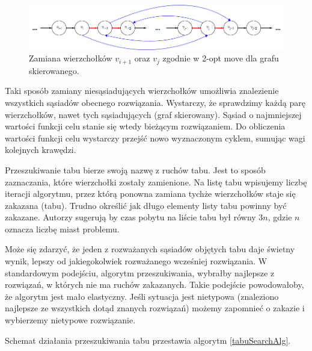 \documentclass[11pt,a4paper,twoside]{article}
\begin{document}
\begin{figure}[ht]
\vspace{-0pt}
\centering
\includegraphics[width=15cm]{2optMove}
\caption{Zamiana wierzchołków $v_{i+1}$ oraz $v_{j}$ zgodnie w 2-opt move dla grafu skierowanego.}
\label{2optMove}
\end{figure}

Taki sposób zamiany niesąsiadujących wierzchołków umożliwia znalezienie wszystkich sąsiadów obecnego rozwiązania. Wystarczy, że sprawdzimy każdą parę wierzchołków, nawet tych sąsiadujących (graf skierowany). Sąsiad o najmniejszej wartości funkcji celu stanie się wtedy bieżącym rozwiązaniem. Do obliczenia wartości funkcji celu wystarczy przejść nowo wyznaczonym cyklem, sumując wagi kolejnych krawędzi.

Przeszukiwanie tabu bierze swoją nazwę z ruchów tabu. Jest to sposób zaznaczania, które wierzchołki zostały zamienione. Na listę tabu wpisujemy liczbę iteracji algorytmu, przez którą ponowna zamiana tychże wierzchołków staje się zakazana (tabu). Trudno określić jak długo elementy listy tabu powinny być zakazane. Autorzy \cite{FogelHeurystyka} sugerują by czas pobytu na liście tabu był równy $3n$, gdzie $n$ oznacza liczbę miast problemu.

Może się zdarzyć, że jeden z rozważanych sąsiadów objętych tabu daje świetny wynik, lepszy od jakiegokolwiek rozważanego wcześniej rozwiązania. W standardowym podejściu, algorytm przeszukiwania, wybrałby najlepsze z rozwiązań, w których nie ma ruchów zakazanych. Takie podejście powodowałoby, że algorytm jest mało elastyczny. Jeśli sytuacja jest nietypowa (znaleziono najlepsze ze wszystkich dotąd znanych rozwiązań) możemy zapomnieć o zakazie i wybierzemy nietypowe rozwiązanie. 

Schemat działania przeszukiwania tabu przestawia algorytm \ref{tabuSearchAlg}.
\end{document}
